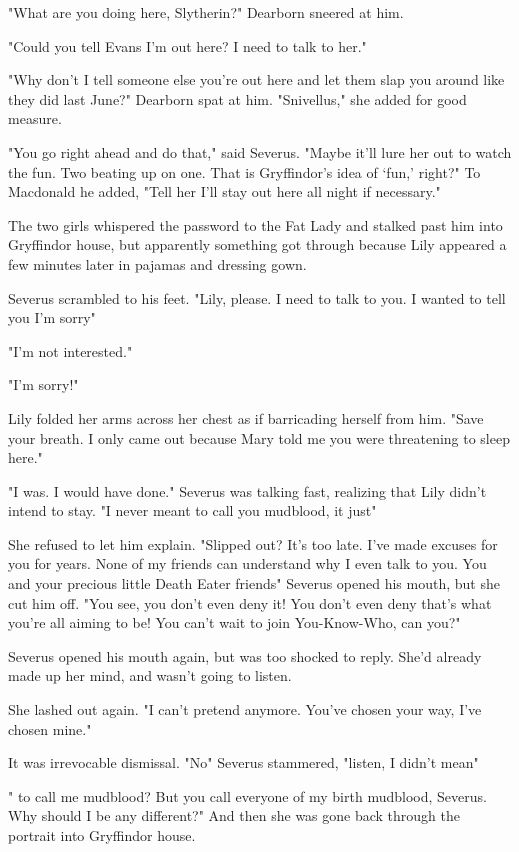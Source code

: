 "What are you doing here, Slytherin?" Dearborn sneered at him.

"Could you tell Evans I'm out here? I need to talk to her."

"Why don't I tell someone else you're out here and let them slap you around like they did last June?" Dearborn spat at him. "Snivellus," she added for good measure.

"You go right ahead and do that," said Severus. "Maybe it'll lure her out to watch the fun. Two beating up on one. That is Gryffindor's idea of `fun,' right?" To Macdonald he added, "Tell her I'll stay out here all night if necessary."

The two girls whispered the password to the Fat Lady and stalked past him into Gryffindor house, but apparently something got through because Lily appeared a few minutes later in pajamas and dressing gown.

Severus scrambled to his feet. "Lily, please. I need to talk to you. I wanted to tell you I'm sorry{\el}"

"I'm not interested."

"I'm sorry!"

Lily folded her arms across her chest as if barricading herself from him. "Save your breath. I only came out because Mary told me you were threatening to sleep here."

"I was. I would have done." Severus was talking fast, realizing that Lily didn't intend to stay. "I never meant to call you mudblood, it just{\el}"

She refused to let him explain. "Slipped out? It's too late. I've made excuses for you for years. None of my friends can understand why I even talk to you. You and your precious little Death Eater friends{\el}" Severus opened his mouth, but she cut him off. "You see, you don't even deny it! You don't even deny that's what you're all aiming to be! You can't wait to join You-Know-Who, can you?"

Severus opened his mouth again, but was too shocked to reply. She'd already made up her mind, and wasn't going to listen.

She lashed out again. "I can't pretend anymore. You've chosen your way, I've chosen mine."

It was irrevocable dismissal. "No{\el}" Severus stammered, "listen, I didn't mean{\el}"

"{\el} to call me mudblood? But you call everyone of my birth mudblood, Severus. Why should I be any different?" And then she was gone back through the portrait into Gryffindor house.

